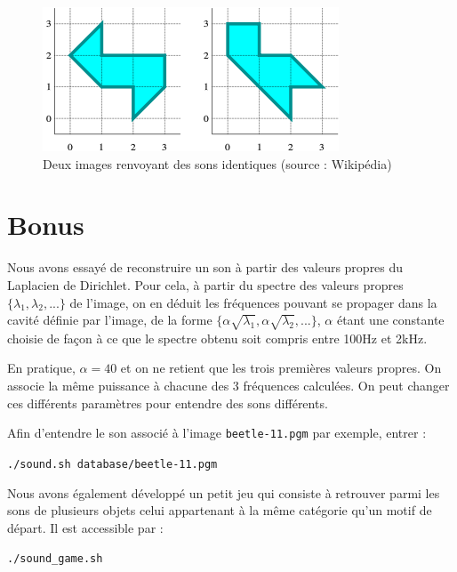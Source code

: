 \documentclass[a4paper,10pt]{article} %
\theoremstyle{definition} %
\begin{document}
\begin{figure}[H]
  \begin{center}
  \includegraphics[scale=0.5]{drums.png}    
  \end{center}
\caption{Deux images renvoyant des sons identiques (source : Wikipédia)}
\label{drum}
\end{figure}


\section*{Bonus}

Nous avons essayé de reconstruire un son à partir des valeurs propres du Laplacien de Dirichlet. Pour cela, à partir du spectre des valeurs propres $\{\lambda_1, \lambda_2, ...\}$ de l'image, on en déduit les fréquences pouvant se propager dans la cavité définie par l'image, de la forme $\{\alpha \sqrt{\lambda_1}, \alpha \sqrt{\lambda_2}, ...\}$, $\alpha$ étant une constante choisie de façon à ce que le spectre obtenu soit compris entre 100Hz et 2kHz.

En pratique, $\alpha = 40$ et on ne retient que les trois premières valeurs propres. On associe la même puissance à chacune des 3 fréquences calculées. On peut changer ces différents paramètres pour entendre des sons différents.

Afin d'entendre le son associé à l'image \texttt{beetle-11.pgm} par exemple, entrer : 
\begin{center}
  \texttt{./sound.sh database/beetle-11.pgm}
\end{center}

Nous avons également développé un petit jeu qui consiste à retrouver parmi les sons de plusieurs objets celui appartenant à la même catégorie qu'un motif de départ. 
Il est accessible par :
\begin{center}
  \texttt{./sound\_game.sh}
\end{center}




\nocite{*}
\end{document}
